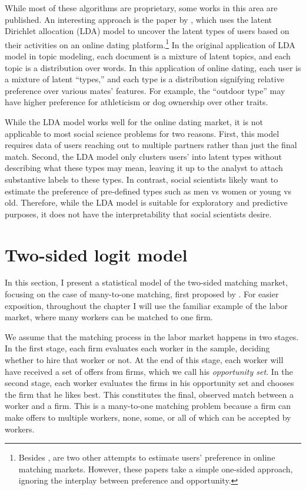 While most of these algorithms are proprietary, some works in this area are
published. An interesting approach is the paper by \citet{Tu2014}, which uses
the latent Dirichlet allocation (LDA) model to uncover the latent types of users
based on their activities on an online dating platform.\footnote{Besides
  \citet{Tu2014}, \citet{Hitsch2010, Goswami2014} are two other attempts to
  estimate users' preference in online matching markets. However, these papers
  take a simple one-sided approach, ignoring the interplay between preference
  and opportunity.} In the original application of LDA model in topic modeling,
each document is a mixture of latent topics, and each topic is a distribution
over words. In this application of online dating, each user is a mixture of
latent ``types,'' and each type is a distribution signifying relative preference
over various mates' features. For example, the ``outdoor type'' may have higher
preference for athleticism or dog ownership over other traits.

While the LDA model works well for the online dating market, it is not
applicable to most social science problems for two reasons. First, this model
requires data of users reaching out to multiple partners rather than just the
final match. Second, the LDA model only clusters users' into latent types
without describing what these types may mean, leaving it up to the analyst to
attach substantive labels to these types. In contrast, social scientists likely
want to estimate the preference of pre-defined types such as men vs women or
young vs old. Therefore, while the LDA model is suitable for exploratory and
predictive purposes, it does not have the interpretability that social
scientists desire.

\section{Two-sided logit model}

In this section, I present a statistical model of the two-sided matching market,
focusing on the case of many-to-one matching, first proposed by
\cite{Logan1996}. For easier exposition, throughout the chapter I will use the
familiar example of the labor market, where many workers can be matched to one
firm.

We assume that the matching process in the labor market happens in two stages.
In the first stage, each firm evaluates each worker in the sample, deciding
whether to hire that worker or not. At the end of this stage, each worker will
have received a set of offers from firms, which we call his \textit{opportunity
  set}. In the second stage, each worker evaluates the firms in his opportunity
set and chooses the firm that he likes best. This constitutes the final,
observed match between a worker and a firm. This is a many-to-one matching
problem because a firm can make offers to multiple workers, none, some, or all
of which can be accepted by workers.

